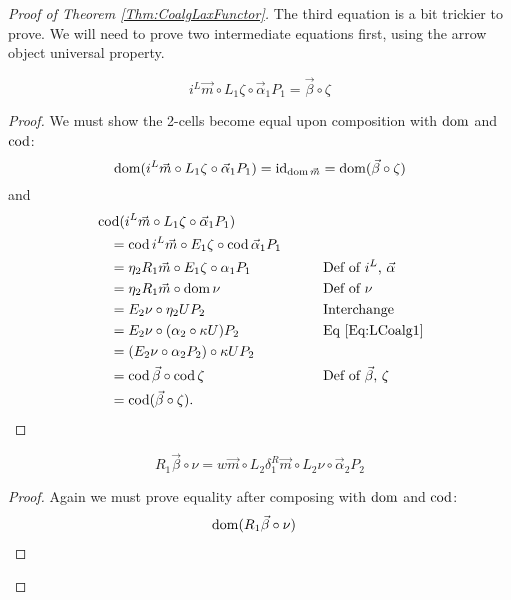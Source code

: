 \begin{proof}[Proof of Theorem \ref{Thm:CoalgLaxFunctor}]
	The third equation is a bit trickier to prove. We will need to prove two intermediate equations first, using the arrow object universal property.
	\begin{lemma*}
		\begin{equation}\label{Eq:CompLem1}
			i^L\vec{m} \circ L_1\zeta \circ \vec{\alpha}_1P_1 = \vec{\beta}\circ\zeta
		\end{equation}
	\end{lemma*}
	\begin{proof}
		We must show the 2-cells become equal upon composition with $\operatorname{dom}$ and $\operatorname{cod}$:
		\[
			\operatorname{dom}(i^L\vec{m} \circ L_1\zeta \circ \vec{\alpha}_1P_1) = \operatorname{id}_{\operatorname{dom}\vec{m}} = \operatorname{dom}(\vec{\beta}\circ\zeta)
		\]
		and
		\begin{alignat*}{2}
			\hspace{1em}&\hspace{-1em} \operatorname{cod}(i^L\vec{m} \circ L_1\zeta \circ \vec{\alpha}_1P_1) && \\
			&= \operatorname{cod} i^L\vec{m} \circ E_1\zeta \circ \operatorname{cod}\vec{\alpha}_1P_1 &\qquad& \\
			&= \eta_2R_1\vec{m} \circ E_1\zeta \circ \alpha_1P_1 
				&& \text{Def of $i^L$, $\vec{\alpha}$} \\
			&= \eta_2R_1\vec{m} \circ \operatorname{dom}\nu
				&& \text{Def of $\nu$} \\
			&= E_2\nu \circ \eta_2UP_2
				&& \text{Interchange} \\
			&= E_2\nu \circ (\alpha_2 \circ \kappa U)P_2
				&& \text{Eq \eqref{Eq:LCoalg1}} \\
			&= (E_2\nu \circ \alpha_2P_2) \circ \kappa UP_2 && \\
			&= \operatorname{cod}\vec{\beta} \circ \operatorname{cod}\zeta
				&& \text{Def of $\vec{\beta}$, $\zeta$} \\
			&= \operatorname{cod}(\vec{\beta}\circ\zeta). &&
		\end{alignat*}
	\end{proof}
	\begin{lemma*}
		\begin{equation}\label{Eq:CompLem2}
			R_1\vec{\beta} \circ \nu = w\vec{m} \circ L_2\delta_1^R\vec{m} \circ L_2\nu \circ \vec{\alpha}_2P_2
		\end{equation}
	\end{lemma*}
	\begin{proof}
		Again we must prove equality after composing with $\operatorname{dom}$ and $\operatorname{cod}$:
		\begin{alignat*}{2}
			\hspace{1em}&\hspace{-1em} \dom(R_1\vec{\beta} \circ \nu) && \\

\end{alignat*}
\end{proof}
\end{proof}
